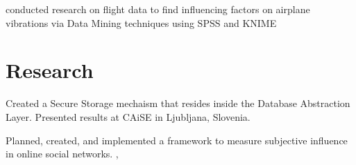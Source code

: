 \documentclass[]{deedy-resume-openfont}
\begin{document}
\begin{minipage}[t]{0.66\textwidth}
\begin{tightemize}
\item conducted research on flight data to find influencing factors on airplane vibrations via Data Mining techniques using SPSS and KNIME
\end{tightemize}
\sectionsep


\section{Research}
Created a Secure Storage mechaism that resides inside the Database Abstraction Layer.
Presented results at CAiSE in Ljubljana, Slovenia.
\cite{lorey2016teal}
\sectionsep

Planned, created, and implemented a framework to measure subjective influence in online social networks. 
\cite{seufert2016assessment}, \cite{seufert2013gamification}
\sectionsep




\end{minipage}
\end{document}
